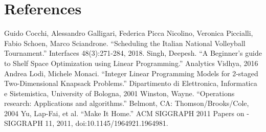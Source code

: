 \documentclass[10pt]{article}
\theoremstyle{named}
\begin{document}
\section{References}
\begin{thebibliography}{9}
 Guido Cocchi, Alessandro Galligari, Federica Picca Nicolino,
  Veronica Piccialli, Fabio Schoen, Marco Sciandrone.
  “Scheduling the Italian National Volleyball Tournament.” Interfaces 48(3):271-284, 2018. 
 Singh, Deepesh. “A Beginner’s guide to Shelf Space Optimization using
  Linear Programming.” Analytics Vidhya, 2016
 Andrea Lodi, Michele Monaci. “Integer Linear Programming Models for
  2-staged Two-Dimensional Knapsack Problems.” Dipartimento di Elettronica,
  Informatica e Sistemistica, University of Bologna, 2001
 Winston, Wayne. “Operations research:
  Applications and algorithms.” Belmont, CA: Thomson/Brooks/Cole, 2004
  Yu, Lap-Fai, et al. “Make It Home.” ACM SIGGRAPH 2011 Papers
  on - SIGGRAPH 11, 2011, doi:10.1145/1964921.1964981.  
\end{thebibliography}
\end{document}
